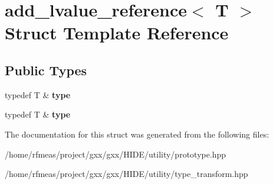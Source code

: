 \hypertarget{structadd__lvalue__reference}{}\section{add\+\_\+lvalue\+\_\+reference$<$ T $>$ Struct Template Reference}
\label{structadd__lvalue__reference}
\subsection*{Public Types}
\begin{DoxyCompactItemize}
\item 
typedef T \& {\bfseries type}\hypertarget{structadd__lvalue__reference_a274411c590e4ff1a7f28f3be09d24e77}{}\label{structadd__lvalue__reference_a274411c590e4ff1a7f28f3be09d24e77}

\item 
typedef T \& {\bfseries type}\hypertarget{structadd__lvalue__reference_a274411c590e4ff1a7f28f3be09d24e77}{}\label{structadd__lvalue__reference_a274411c590e4ff1a7f28f3be09d24e77}

\end{DoxyCompactItemize}


The documentation for this struct was generated from the following files\+:\begin{DoxyCompactItemize}
\item 
/home/rfmeas/project/gxx/gxx/\+H\+I\+D\+E/utility/prototype.\+hpp\item 
/home/rfmeas/project/gxx/gxx/\+H\+I\+D\+E/utility/type\+\_\+transform.\+hpp\end{DoxyCompactItemize}
